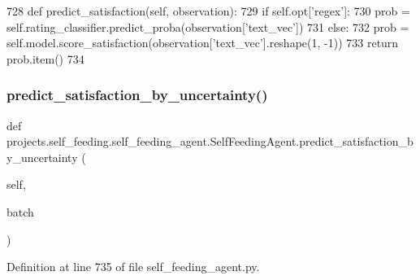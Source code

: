\begin{DoxyCode}
728     \textcolor{keyword}{def }predict\_satisfaction(self, observation):
729         \textcolor{keywordflow}{if} self.opt[\textcolor{stringliteral}{'regex'}]:
730             prob = self.rating\_classifier.predict\_proba(observation[\textcolor{stringliteral}{'text\_vec'}])
731         \textcolor{keywordflow}{else}:
732             prob = self.model.score\_satisfaction(observation[\textcolor{stringliteral}{'text\_vec'}].reshape(1, -1))
733         \textcolor{keywordflow}{return} prob.item()
734 
\end{DoxyCode}
\mbox{\label{classprojects_1_1self__feeding_1_1self__feeding__agent_1_1SelfFeedingAgent_a2788bb764560c9d021ac0b8a5596e1e0}} 
\subsubsection{\texorpdfstring{predict\+\_\+satisfaction\+\_\+by\+\_\+uncertainty()}{predict\_satisfaction\_by\_uncertainty()}}
{\footnotesize\ttfamily def projects.\+self\+\_\+feeding.\+self\+\_\+feeding\+\_\+agent.\+Self\+Feeding\+Agent.\+predict\+\_\+satisfaction\+\_\+by\+\_\+uncertainty (\begin{DoxyParamCaption}\item[{}]{self,  }\item[{}]{batch }\end{DoxyParamCaption})}



Definition at line 735 of file self\+\_\+feeding\+\_\+agent.\+py.


